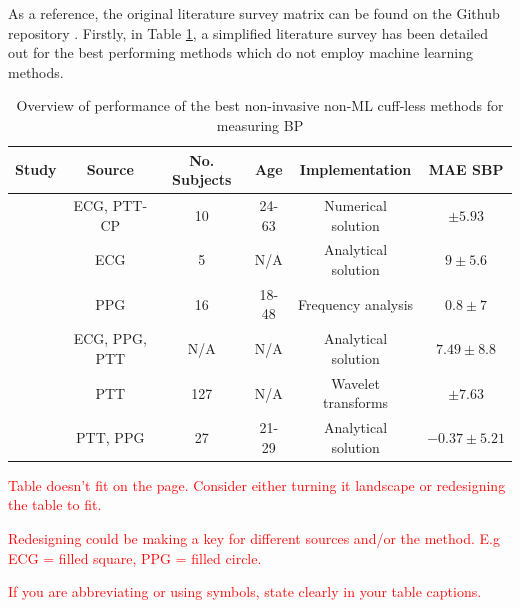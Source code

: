 As a reference, the original literature survey matrix can be found on 
the Github repository \cite{LitSurvey}. Firstly, in 
Table \ref{litsurveytab}, a simplified literature survey has 
been detailed out for the best performing methods which do not 
employ machine learning methods. 
\begin{table}[H]
\caption{Overview of performance of the best non-invasive non-ML cuff-less methods for measuring BP}
\begin{tabular}{|c|c|c|c|c|c|}
\hline
\textbf{Study} & \textbf{Source} & \textbf{No. Subjects} & \textbf{Age} & \textbf{Implementation} & \textbf{MAE SBP} \\ \hline
\cite{Ahmad2012} & ECG, PTT-CP & 10 & 24-63 & Numerical solution & $\pm 5.93$ \\
\cite{Chen2013} & ECG & 5 & N/A & Analytical solution &  $9 \pm 5.6$\\
\cite{Daimiwal2014} & PPG & 16 & 18-48 & Frequency analysis &  $0.8 \pm  7$\\
\cite{Chan2001} & ECG, PPG, PTT & N/A & N/A & Analytical solution &  $7.49 \pm  8.8$\\
\cite{Yamanaka2016} & PTT & 127 & N/A & Wavelet transforms &  $\pm 7.63$\\
\cite{Ding2016} & PTT, PPG & 27 & 21-29 & Analytical solution &  $-0.37 \pm  5.21$\\ \hline
\end{tabular}
\label{litsurveytab}
\end{table}

\textcolor{red}{Table doesn't fit on the page. Consider either turning it landscape or redesigning the table to fit.}

\textcolor{red}{Redesigning could be making a key for different sources and/or the method. E.g ECG = filled square, PPG = filled circle.}

\textcolor{red}{If you are abbreviating or using symbols, state clearly in your table captions.}


